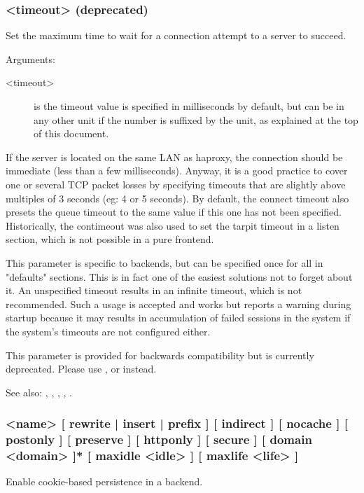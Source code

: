\subsubsection[contimeout]{ <timeout> (deprecated)}

  Set the maximum time to wait for a connection attempt to a server to succeed.

  Arguments:
  \begin{description}
  \item[<timeout>] is the timeout value is specified in milliseconds by default, but
              can be in any other unit if the number is suffixed by the unit,
              as explained at the top of this document.  
  \end{description}

  If the server is located on the same LAN as haproxy, the connection should be
  immediate (less than a few milliseconds). Anyway, it is a good practice to
  cover one or several TCP packet losses by specifying timeouts that are
  slightly above multiples of 3 seconds (eg: 4 or 5 seconds). By default, the
  connect timeout also presets the queue timeout to the same value if this one
  has not been specified. Historically, the contimeout was also used to set the
  tarpit timeout in a listen section, which is not possible in a pure frontend.

  This parameter is specific to backends, but can be specified once for all in
  "defaults" sections. This is in fact one of the easiest solutions not to
  forget about it. An unspecified timeout results in an infinite timeout, which
  is not recommended. Such a usage is accepted and works but reports a warning
  during startup because it may results in accumulation of failed sessions in
  the system if the system's timeouts are not configured either.

  This parameter is provided for backwards compatibility but is currently
  deprecated. Please use ,  or 
  instead.


See also: , , ,
             , .


\subsubsection[cookie]{ <name> [ rewrite | insert | prefix ] [ indirect ]  [ nocache ] [ postonly ] [ preserve ] [ httponly ] [ secure ] [ domain <domain> ]* [ maxidle <idle> ] [ maxlife <life> ]}
  Enable cookie-based persistence in a backend.
  
